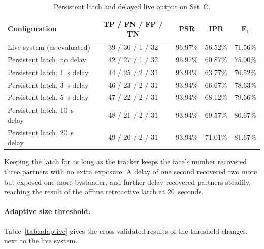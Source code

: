 \begin{table}[htbp]
\begin{singlespace}
\centering
\caption{Persistent latch and delayed live output on Set~C.}
\label{tab:delay}
\renewcommand{\arraystretch}{1.3}
\begin{tabular}{@{}lcccc@{}}
\toprule
\textbf{Configuration} & \textbf{TP / FN / FP / TN} & \textbf{PSR} & \textbf{IPR} & \textbf{F$_1$} \\
\midrule
Live system (as evaluated)        & 39 / 30 / 1 / 32 & 96.97\% & 56.52\% & 71.56\% \\
Persistent latch, no delay        & 42 / 27 / 1 / 32 & 96.97\% & 60.87\% & 75.00\% \\
Persistent latch, 1~s delay       & 44 / 25 / 2 / 31 & 93.94\% & 63.77\% & 76.52\% \\
Persistent latch, 3~s delay       & 46 / 23 / 2 / 31 & 93.94\% & 66.67\% & 78.63\% \\
Persistent latch, 5~s delay       & 47 / 22 / 2 / 31 & 93.94\% & 68.12\% & 79.66\% \\
Persistent latch, 10~s delay      & 48 / 21 / 2 / 31 & 93.94\% & 69.57\% & 80.67\% \\
Persistent latch, 20~s delay      & 49 / 20 / 2 / 31 & 93.94\% & 71.01\% & 81.67\% \\
\bottomrule
\end{tabular}
\end{singlespace}
\end{table}

Keeping the latch for as long as the tracker keeps the face's number recovered three
partners with no extra exposure. A delay of one second recovered two more but exposed one
more bystander, and further delay recovered partners steadily, reaching the result of the
offline retroactive latch at 20~seconds.

\paragraph{Adaptive size threshold.}
Table~\ref{tab:adaptive} gives the cross-validated results of the threshold changes, next
to the live system.

